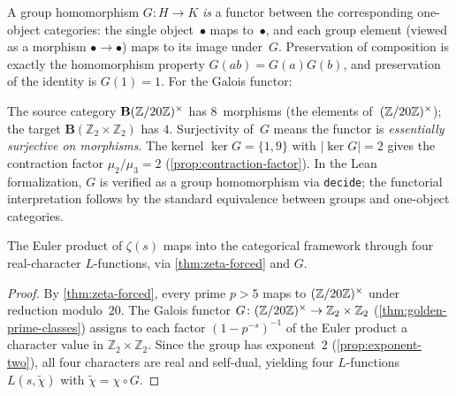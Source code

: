 \begin{remark}%
\label{rmk:galois-categorical}
A group homomorphism $G\colon H\to K$ \emph{is} a functor between the
corresponding one-object categories: the single object~$\bullet$
maps to~$\bullet$, and each group element (viewed as a morphism
$\bullet\to\bullet$) maps to its image under~$G$.  Preservation of
composition is exactly the homomorphism property $G(ab)=G(a)G(b)$,
and preservation of the identity is $G(1)=1$.  For the Galois functor:
%
\begin{center}
\end{center}
%
\noindent
The source category $\mathbf{B}(\mathbb{Z}/20\mathbb{Z})^\times$ has $8$~morphisms (the
elements of~$(\mathbb{Z}/20\mathbb{Z})^\times$); the target $\mathbf{B}(\mathbb{Z}_2\times
\mathbb{Z}_2)$ has $4$.  Surjectivity of~$G$ means the functor is
\emph{essentially surjective on morphisms}.  The kernel $\ker G =
\{1,9\}$ with $|\ker G|=2$ gives the contraction factor
$\mu_2/\mu_3=2$ (\cref{prop:contraction-factor}).
In the Lean formalization, $G$ is verified as a group homomorphism via
\texttt{decide}; the functorial interpretation follows by the standard
equivalence between groups and one-object categories.
\end{remark}

\begin{theorem}\label{thm:zeta-factorization}
The Euler product of $\zeta(s)$ maps into the categorical framework
through four real-character $L$-functions, via
\cref{thm:zeta-forced} and $G$.
\end{theorem}

\begin{proof}
By \cref{thm:zeta-forced}, every prime $p>5$ maps to $(\mathbb{Z}/20\mathbb{Z})^\times$
under reduction modulo~$20$.  The Galois functor
$G\colon(\mathbb{Z}/20\mathbb{Z})^\times\to\mathbb{Z}_2\times\mathbb{Z}_2$
(\cref{thm:golden-prime-classes}) assigns to each factor
$(1-p^{-s})^{-1}$ of the Euler product a character value in
$\mathbb{Z}_2\times\mathbb{Z}_2$.  Since the group has exponent~$2$
(\cref{prop:exponent-two}), all four characters are real and
self-dual, yielding four $L$-functions $L(s,\tilde{\chi})$ with
$\tilde{\chi} = \chi \circ G$.
\end{proof}




